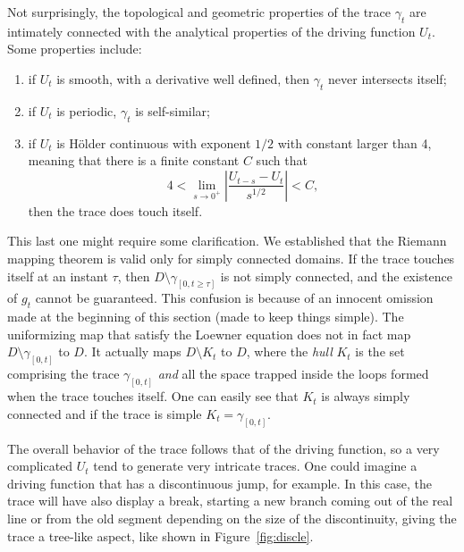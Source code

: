 Not surprisingly, the topological and geometric properties of the trace
$\gamma_t$ are intimately connected with the analytical properties of the
driving function $U_t$. Some properties include:
\begin{enumerate}
    \item if $U_t$ is smooth, with a derivative well defined, then $\gamma_t$
        never intersects itself;
    \item if $U_t$ is periodic, $\gamma_t$ is self-similar;
    \item if $U_t$ is H\"older continuous with exponent $1/2$ with constant
        larger than 4, meaning that there is a finite constant $C$ such that
        \begin{equation}
            \label{eq:holder}
            4<\lim_{s\rightarrow0^{+}}\left|
                \frac{U_{t-s}-U_{t}}{s^{1/2}}\right|
            <C,
        \end{equation}
        then the trace does touch itself.
\end{enumerate}
This last one might require some clarification. We established that the Riemann
mapping theorem is valid only for simply connected domains. If the trace touches
itself at an instant $\tau$, then $D\setminus\gamma_{[0,t\geq\tau]}$ is not
simply connected, and the existence of $g_t$ cannot be guaranteed. This
confusion is because of an innocent omission made at the beginning of this
section (made to keep things simple). The uniformizing map that satisfy the
Loewner equation does not in fact map $D\setminus\gamma_{[0,t]}$ to $D$. It
actually maps $D\setminus K_t$ to $D$, where the \textit{hull} $K_t$ is the set
comprising the trace $\gamma_{[0,t]}$ \textit{and} all the space trapped inside
the loops formed when the trace touches itself. One can easily see that $K_t$
is always simply connected and if the trace is simple $K_t = \gamma_{[0,t]}$.

The overall behavior of the trace follows that of the driving function, so a
very complicated $U_t$ tend to generate very intricate traces. One could
imagine a driving function that has a discontinuous jump, for example. In this
case, the trace will have also display a break, starting a new branch coming
out of the real line or from the old segment depending on the size of the
discontinuity, giving the trace a tree-like aspect, like shown in
Figure~\ref{fig:discle}.



